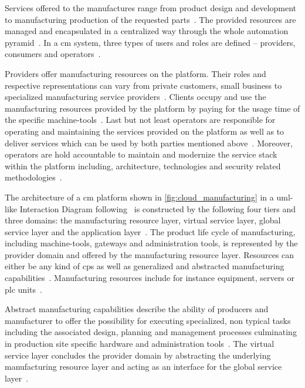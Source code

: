 \documentclass[
a4paper,
twoside,
headsepline,
cleardoublepage=empty,
parskip=half,
draft=false
]{scrbook}
\begin{document}
			Services offered to the manufactures range from product design and development to manufacturing production of the requested parts~\cite{xu2012cloud}. The provided resources  are managed and encapsulated in a centralized way through the whole automation pyramid~\cite{kleinemeier2014automatisierungspyramide}.
			In a \gls{cm} system, three types of users and roles are defined -- providers, consumers and operators~\cite{wu2013cloud}.

			Providers offer manufacturing resources on the platform.
			Their roles and respective representations can vary from private customers, small business to specialized manufacturing service providers~\cite{tao2014cciot}.
			Clients occupy and use the manufacturing resources provided by the platform by paying for the usage time of the specific machine-tools~\cite{he2015state}.
			Last but not least operators are responsible for operating and maintaining the services provided on the platform as well as to deliver services which can be used by both parties mentioned above~\cite{xu2012cloud}.
			Moreover, operators are hold accountable to maintain and modernize the service stack within the platform including, architecture, technologies and security related methodologies~\cite{tedeschi2015security}.
			
			The architecture of a \gls{cm} platform shown in \cref{fig:cloud_manufacturing} in a \gls{uml}-like Interaction Diagram following~\cite{uml2017} is constructed by the following four tiers and three domains: the manufacturing resource layer, virtual service layer, global service layer and the application layer~\cite{wu2013cloud}.
			The product life cycle of manufacturing, including machine-tools, gateways and administration tools, is represented by the provider domain and offered by the manufacturing resource layer.
			Resources can either be any kind of \gls{cps} as well as generalized and abstracted manufacturing capabilities~\cite{kleinemeier2014automatisierungspyramide}.
			Manufacturing resources include for instance equipment, servers or \gls{plc} units~\cite{xu2012cloud}.
			
			Abstract manufacturing capabilities describe the ability of producers and manufacturer to offer the possibility for executing specialized, non typical tasks including the associated design, planning and management processes culminating in production site specific hardware and administration tools~\cite{he2015state}.
			The virtual service layer concludes the provider domain by abstracting the underlying manufacturing resource layer and acting as an interface for the global service layer~\cite{xu2012cloud}.
			
\end{document}
